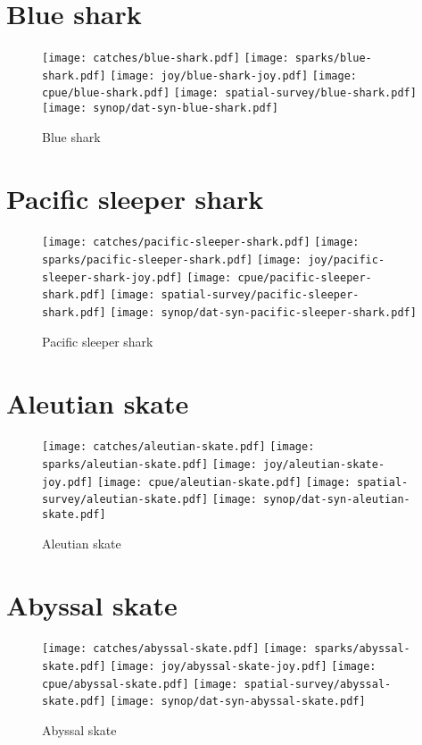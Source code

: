 \section*{Blue shark}

\begin{figure}[htbp]
\centering
\texttt{[image: catches/blue-shark.pdf]}
\texttt{[image: sparks/blue-shark.pdf]}
\texttt{[image: joy/blue-shark-joy.pdf]}
\texttt{[image: cpue/blue-shark.pdf]}
\texttt{[image: spatial-survey/blue-shark.pdf]}
\texttt{[image: synop/dat-syn-blue-shark.pdf]}
\caption{Blue shark}
\end{figure}
\clearpage
\section*{Pacific sleeper shark}

\begin{figure}[htbp]
\centering
\texttt{[image: catches/pacific-sleeper-shark.pdf]}
\texttt{[image: sparks/pacific-sleeper-shark.pdf]}
\texttt{[image: joy/pacific-sleeper-shark-joy.pdf]}
\texttt{[image: cpue/pacific-sleeper-shark.pdf]}
\texttt{[image: spatial-survey/pacific-sleeper-shark.pdf]}
\texttt{[image: synop/dat-syn-pacific-sleeper-shark.pdf]}
\caption{Pacific sleeper shark}
\end{figure}
\clearpage
\section*{Aleutian skate}

\begin{figure}[htbp]
\centering
\texttt{[image: catches/aleutian-skate.pdf]}
\texttt{[image: sparks/aleutian-skate.pdf]}
\texttt{[image: joy/aleutian-skate-joy.pdf]}
\texttt{[image: cpue/aleutian-skate.pdf]}
\texttt{[image: spatial-survey/aleutian-skate.pdf]}
\texttt{[image: synop/dat-syn-aleutian-skate.pdf]}
\caption{Aleutian skate}
\end{figure}
\clearpage
\section*{Abyssal skate}

\begin{figure}[htbp]
\centering
\texttt{[image: catches/abyssal-skate.pdf]}
\texttt{[image: sparks/abyssal-skate.pdf]}
\texttt{[image: joy/abyssal-skate-joy.pdf]}
\texttt{[image: cpue/abyssal-skate.pdf]}
\texttt{[image: spatial-survey/abyssal-skate.pdf]}
\texttt{[image: synop/dat-syn-abyssal-skate.pdf]}
\caption{Abyssal skate}
\end{figure}
\clearpage
